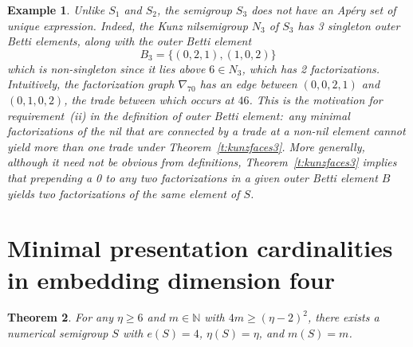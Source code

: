 \documentclass[10pt,a4paper]{amsart}
\newtheorem{thm}{Theorem}[section]
\newtheorem{exam}[thm]{Example}
\begin{document}
\begin{exam}
Unlike $S_1$ and $S_2$, the semigroup $S_3$ does not have an Ap\'ery set of unique expression.  Indeed, the Kunz nilsemigroup $N_3$ of $S_3$ has 3 singleton outer Betti elements, along with the outer Betti element 
$$B_3 = \{(0,2,1), (1,0,2)\}$$
which is non-singleton since it lies above $6 \in N_3$, which has 2 factorizations.  Intuitively, the factorization graph $\nabla_{70}$ has an edge between $(0,0,2,1)$ and $(0,1,0,2)$, the trade between which occurs at $46$.  This is the motivation for requirement~(ii) in the definition of outer Betti element:\ any minimal factorizations of the nil that are connected by a trade at a non-nil element cannot yield more than one trade under Theorem~\ref{t:kunzfaces3}.  
More generally, although it need not be obvious from definitions, Theorem~\ref{t:kunzfaces3} implies that prepending a 0 to any two factorizations in a given outer Betti element $B$ yields two factorizations of the same element of $S$.  
\end{exam}

\section{Minimal presentation cardinalities in embedding dimension four}
\setcounter{section}{6}\setcounter{thm}{2}
\begin{thm}\label{t:embdim4}
For any $\eta \geq 6$ and $m \in \mathbb{N}$ with $4m \geq (\eta-2)^2$, there exists a numerical semigroup $S$ with $e(S) = 4$, $\eta(S) = \eta$, and $m(S) = m$.
\end{thm}
\end{document}
